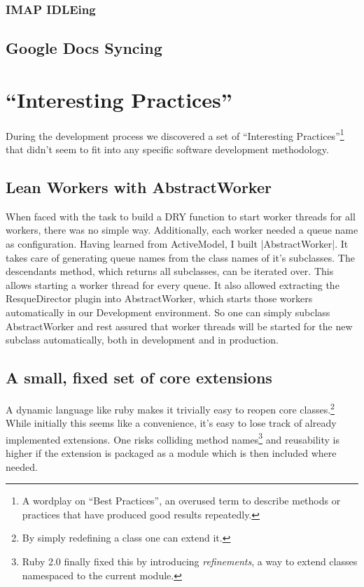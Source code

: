 \subsubsection{IMAP IDLEing}



\subsection{Google Docs Syncing}




\section{``Interesting Practices''}

During the development process we discovered a set of ``Interesting Practices''\footnote{A wordplay on ``Best Practices'', an overused term to describe methods or practices that have produced good results repeatedly.} that didn't seem to fit into any specific software development methodology.

\subsection{Lean Workers with AbstractWorker}

When faced with the task to build a DRY function to start worker threads for all workers, there was no simple way. Additionally, each worker needed a queue name as configuration. Having learned from ActiveModel, I built |AbstractWorker|. It takes care of generating queue names from the class names of it’s subclasses. The descendants method, which returns all subclasses, can be iterated over. This allows starting a worker thread for every queue. It also allowed extracting the ResqueDirector plugin into AbstractWorker, which starts those workers automatically in our Development environment. So one can simply subclass AbstractWorker and rest assured that worker threads will be started for the new subclass automatically, both in development and in production.

\subsection{A small, fixed set of core extensions}

A dynamic language like ruby makes it trivially easy to reopen core classes.\footnote{By simply redefining a class one can extend it.} While initially this seems like a convenience, it's easy to lose track of already implemented extensions. One risks colliding method names\footnote{Ruby 2.0 finally fixed this by introducing \emph{refinements}, a way to extend classes namespaced to the current module.} and reusability is higher if the extension is packaged as a module which is then included where needed.

